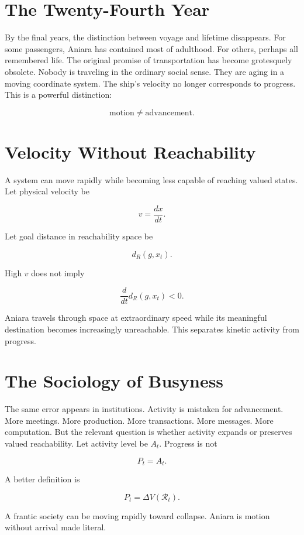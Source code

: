 \documentclass[11pt,oneside]{book}
\theoremstyle{definition}
\theoremstyle{remark}
\newcommand{\R}{\mathcal{R}}
\begin{document}
\section{The Twenty-Fourth Year}

By the final years, the distinction between voyage and lifetime disappears. For some passengers,
Aniara has contained most of adulthood. For others, perhaps all remembered life. The original
promise of transportation has become grotesquely obsolete. Nobody is traveling in the ordinary
social sense. They are aging in a moving coordinate system. The ship's velocity no longer
corresponds to progress. This is a powerful distinction:

\[
\text{motion} \neq \text{advancement}.
\]

\section{Velocity Without Reachability}

A system can move rapidly while becoming less capable of reaching valued states. Let physical
velocity be

\[
v=\frac{dx}{dt}.
\]

Let goal distance in reachability space be

\[
d_R(g,x_t).
\]

High \(v\) does not imply

\[
\frac{d}{dt}d_R(g,x_t)<0.
\]

Aniara travels through space at extraordinary speed while its meaningful destination becomes
increasingly unreachable. This separates kinetic activity from progress.

\section{The Sociology of Busyness}

The same error appears in institutions. Activity is mistaken for advancement. More meetings. More
production. More transactions. More messages. More computation. But the relevant question is whether
activity expands or preserves valued reachability. Let activity level be \(A_t\). Progress is not

\[
P_t=A_t.
\]

A better definition is

\[
P_t = \Delta V(\R_t).
\]

A frantic society can be moving rapidly toward collapse. Aniara is motion without arrival made
literal.
\end{document}
